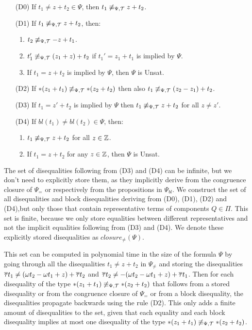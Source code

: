 \begin{enumerate}
  \item[(D0)] If $t_1 \neq z + t_2 \in \Psi$, then $t_1 \not\equiv_{\Psi,\mathcal{T}} z + t_2$.
  \item[(D1)] If $t_1 \not\equiv_{\Psi,\mathcal{T}} z + t_2$, then:
    \begin{enumerate}
      \item $t_2 \not\equiv_{\Psi,\mathcal{T}} - z + t_1$.
      \item $t'_1\not\equiv_{\Psi,\mathcal{T}} (z_1 + z) + t_2$ if $t_1' = z_1 + t_1$ is implied by $\Psi$.
      \item If $t_1 = z + t_2$ is implied by $\Psi$, then $\Psi$ is Unsat.
    \end{enumerate}
  \item[(D2)] If $*(z_1 + t_1) \not\equiv_{\Psi,\mathcal{T}} *(z_2 + t_2)$ then also $t_1 \not\equiv_{\Psi,\mathcal{T}} (z_2 - z_1) + t_2$.
  \item[(D3)] If $t_1 = z' + t_2$ is implied by $\Psi$ then $t_1 \not\equiv_{\Psi,\mathcal{T}} z + t_2$ for all $z \neq z'$.
  \item[(D4)] If $bl(t_1) \neq bl(t_2) \in \Psi$, then:
    \begin{enumerate}
      \item $t_1 \not\equiv_{\Psi,\mathcal{T}} z + t_2$ for all $z \in \mathbb{Z}$.
      \item If $t_1 = z + t_2$ for any $z \in \mathbb{Z}$, then $\Psi$ is Unsat.
    \end{enumerate}
\end{enumerate}

The set of disequalities following from (D3) and (D4) can be infinite, but we don't need to explicitly store them, as they implicitly derive from the congruence closure of $\Psi_=$ or respectively from the propositions in $\Psi_{bl}$.
We construct the set of all disequalities and block disequalities deriving from (D0), (D1), (D2) and (D4),but only those that contain representative terms of components $Q\in\Pi$.
This set is finite, because we only store equalities between different representatives and not the implicit equalities following from (D3) and (D4).
We denote these explicitly stored disequalities as $closure_\neq(\Psi)$.

This set can be computed in polynomial time in the size of the formula $\Psi$ by going through all the
disequalities $t_1 \neq z + t_2$ in $\Psi_\neq$ and storing the disequalities
$\overline{\tau} t_1  \neq (\omega t_2 - \omega t_1 + z) + \overline{\tau} t_2$ and $\overline{\tau} t_2 \neq - (\omega t_2 - \omega t_1 + z) + \overline{\tau} t_1$.
Then for each disequality of the type $*(z_1 + t_1) \not\equiv_{\Psi,\mathcal{T}} *(z_2 + t_2)$ that follows from a stored disequality or from the congruence closure of $\Psi_=$ or from a block disequality,
the disequalities propagate backwards using the rule (D2).
This only adds a finite amount of disequalities to the set, given that each equality and each block disequality implies at most one disequality of the type $*(z_1 + t_1) \not\equiv_{\Psi,\mathcal{T}} *(z_2 + t_2)$.

